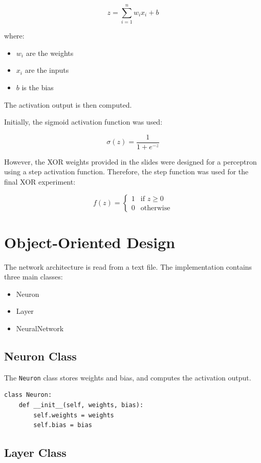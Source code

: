 \documentclass{article}
\begin{document}
\[
z = \sum_{i=1}^{n} w_i x_i + b
\]

where:

\begin{itemize}
    \item $w_i$ are the weights
    \item $x_i$ are the inputs
    \item $b$ is the bias
\end{itemize}

The activation output is then computed.

Initially, the sigmoid activation function was used:

\[
\sigma(z) = \frac{1}{1 + e^{-z}}
\]

However, the XOR weights provided in the slides were designed for a perceptron using a step activation function. Therefore, the step function was used for the final XOR experiment:

\[
f(z) =
\begin{cases}
1 & \text{if } z \geq 0 \\
0 & \text{otherwise}
\end{cases}
\]

\section{Object-Oriented Design}
The network architecture is read from a text file. The implementation contains three main classes:

\begin{itemize}
    \item Neuron
    \item Layer
    \item NeuralNetwork
\end{itemize}

\subsection{Neuron Class}

The \texttt{Neuron} class stores weights and bias, and computes the activation output.

\begin{lstlisting}
class Neuron:
    def __init__(self, weights, bias):
        self.weights = weights
        self.bias = bias
\end{lstlisting}

\subsection{Layer Class}
\end{document}
